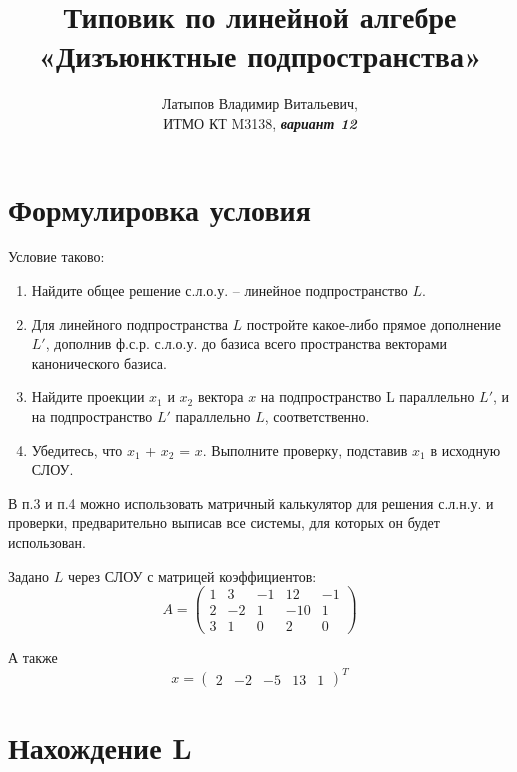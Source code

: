 \documentclass[12pt, a4paper]{article}
\author{Латыпов Владимир Витальевич, \\ ИТМО КТ M3138, \Huge{\textit{\textbf{вариант 12}}}}
\title{Типовик по линейной алгебре «Дизъюнктные подпространства»}
\begin{document}
    \tit

    \section{Формулировка условия}

    \begin{statement}
        Условие таково: 

        \begin{enumerate}
            \item Найдите общее решение с.л.о.у. – линейное подпространство $L$.
            \item Для линейного подпространства $L$ постройте какое-либо прямое дополнение $L'$,
            дополнив ф.с.р. с.л.о.у. до базиса всего пространства векторами канонического базиса.
            \item Найдите проекции $x_1$ и $x_2$ вектора $x$ на подпространство L параллельно $L'$, и на
            подпространство $L'$ параллельно $L$, соответственно.
            \item Убедитесь, что $x_1$ + $x_2$ = $x$. Выполните проверку, подставив $x_1$ в исходную СЛОУ.
        \end{enumerate}
        
        В п.3 и п.4 можно использовать матричный калькулятор для решения с.л.н.у. и
        проверки, предварительно выписав все системы, для которых он будет использован.

        Задано $L$ через СЛОУ с матрицей коэффициентов:
        \begin{equation}
            A = \begin{pmatrix}
                1 & 3 & -1 & 12 & -1 \\
                2 & -2 & 1 & -10 & 1 \\
                3 & 1 & 0 & 2 & 0
            \end{pmatrix}
        \end{equation}

        А также
        \begin{equation}
            x = \begin{pmatrix}
                2 & -2 & -5 & 13 & 1
            \end{pmatrix}^T
        \end{equation}
    \end{statement}

    \section{Нахождение L}
\end{document}
